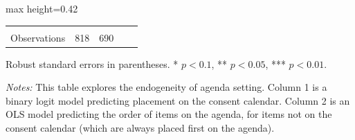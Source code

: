 \begin{table}[H]
\begin{adjustbox}{max height=0.42\textheight}
\begin{threeparttable}
\begin{tabular}{lcccc}
 & & \\ 
Observations  & 818 & 690 \\ [1.8ex]
\bottomrule
\end{tabular}
\begin{tablenotes}[flushleft]
\footnotesize
\item Robust standard errors in parentheses. * $p<0.1$, ** $p<0.05$, *** $p<0.01$.
\item \textit{Notes:} This table explores the endogeneity of agenda setting. Column 1 is a binary logit model predicting placement on the consent calendar. Column 2 is an OLS model predicting the order of items on the agenda, for items not on the consent calendar (which are always placed first on the agenda).
\end{tablenotes}
\end{threeparttable}
\end{adjustbox}
\end{table}
